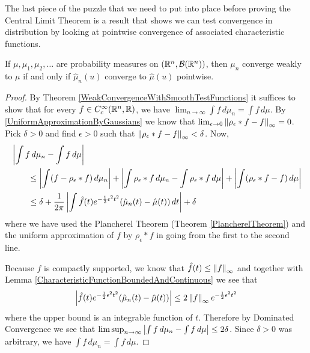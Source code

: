 The last piece of the puzzle that we need to put into place before
proving the Central Limit Theorem is a result that shows we can test
convergence in distribution by looking at pointwise convergence of
associated characteristic functions.
\begin{thm}\label{GlivenkoLevyContinuity}If $\mu, \mu_1, \mu_2, \dots$
  are probability measures on $(\mathbb{R}^n, \mathcal{B}(\mathbb{R}^n))$,
  then $\mu_n$ converge weakly to $\mu$ if and only if $\hat{\mu}_n(u)$
  converge to $\hat{\mu}(u)$ pointwise.
\end{thm}
\begin{proof}
By Theorem \ref{WeakConvergenceWithSmoothTestFunctions} it suffices to
show that for every $f \in C^\infty_c(\mathbb{R}^n, \mathbb{R})$, we have $\lim_{n
  \to \infty} \int f
\, d\mu_n = \int f \, d\mu$.  By \ref{UniformApproximationByGaussians}
we know that $\lim_{\epsilon \to 0}
\left \lVert \rho_\epsilon * f - f \right \rVert_\infty = 0$.  Pick $\delta > 0$ and find
$\epsilon > 0$ such that $\left \lVert \rho_\epsilon * f - f \right \rVert_\infty <
\delta$.
Now, 
\begin{align*}
&\left \vert \int f \, d\mu_n - \int f \, d\mu \right \vert \\
&\qquad \leq \left \vert \int (f - \rho_\epsilon * f) \, d\mu_n \right \vert + \left \vert \int \rho_\epsilon * f \, d\mu_n -
  \int \rho_\epsilon * f \, d\mu \right \vert + \left \vert \int (\rho_\epsilon * f - f)
  \, d\mu \right \vert \\
&\qquad \leq \delta + \frac{1}{2\pi} \left \vert \int \hat{f}(t)  e^{-\frac{1}{2}\epsilon^2t^2} (\hat{\mu}_n(t) - \hat{\mu}(t)) \, dt \right \vert
+ \delta 
\end{align*}
where we have used the Plancherel Theorem (Theorem
\ref{PlancherelTheorem}) and the uniform
approximation of $f$ by $\rho_\epsilon * f$ in going from the first to
the second line.

Because $f$ is compactly supported, we know that $\hat{f}(t) \leq
\left \lVert f \right \rVert_\infty$ and together with Lemma
\ref{CharacteristicFunctionBoundedAndContinuous} we see that 
\begin{align*}
\left \vert \hat{f}(t)
  e^{-\frac{1}{2}\epsilon^2t^2} (\hat{\mu}_n(t) - \hat{\mu}(t)) \right \vert \leq
2\left \lVert f \right \rVert_\infty e^{-\frac{1}{2}\epsilon^2t^2}
\end{align*} where the upper bound
is an integrable function of $t$.  Therefore by Dominated Convergence
we see that $\limsup_{n \to \infty} \left \vert \int f \, d\mu_n - \int f \,
  d\mu \right \vert  \leq 2\delta$.  Since $\delta>0$ was arbitrary, we have $\int f \, d\mu_n = \int f \,  d\mu$.
\end{proof}

